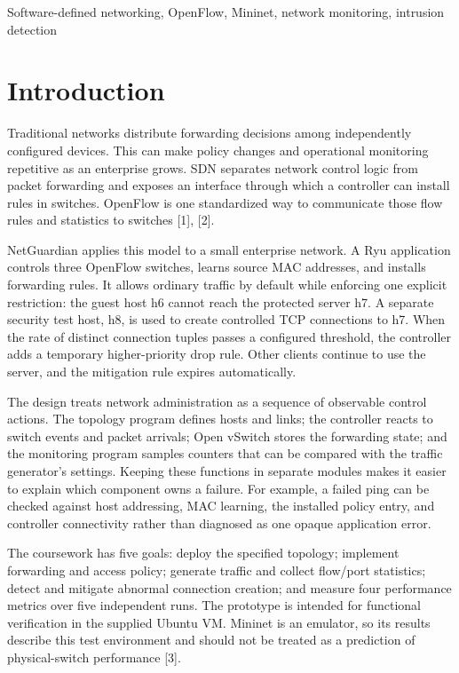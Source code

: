 \documentclass[conference]{IEEEtran}
\begin{document}
\begin{IEEEkeywords}
Software-defined networking, OpenFlow, Mininet, network monitoring, intrusion detection
\end{IEEEkeywords}

\section{Introduction}
Traditional networks distribute forwarding decisions among independently configured devices. This can make policy changes and operational monitoring repetitive as an enterprise grows. SDN separates network control logic from packet forwarding and exposes an interface through which a controller can install rules in switches. OpenFlow is one standardized way to communicate those flow rules and statistics to switches [1], [2].

NetGuardian applies this model to a small enterprise network. A Ryu application controls three OpenFlow switches, learns source MAC addresses, and installs forwarding rules. It allows ordinary traffic by default while enforcing one explicit restriction: the guest host h6 cannot reach the protected server h7. A separate security test host, h8, is used to create controlled TCP connections to h7. When the rate of distinct connection tuples passes a configured threshold, the controller adds a temporary higher-priority drop rule. Other clients continue to use the server, and the mitigation rule expires automatically.

The design treats network administration as a sequence of observable control actions. The topology program defines hosts and links; the controller reacts to switch events and packet arrivals; Open vSwitch stores the forwarding state; and the monitoring program samples counters that can be compared with the traffic generator's settings. Keeping these functions in separate modules makes it easier to explain which component owns a failure. For example, a failed ping can be checked against host addressing, MAC learning, the installed policy entry, and controller connectivity rather than diagnosed as one opaque application error.

The coursework has five goals: deploy the specified topology; implement forwarding and access policy; generate traffic and collect flow/port statistics; detect and mitigate abnormal connection creation; and measure four performance metrics over five independent runs. The prototype is intended for functional verification in the supplied Ubuntu VM. Mininet is an emulator, so its results describe this test environment and should not be treated as a prediction of physical-switch performance [3].
\end{document}

